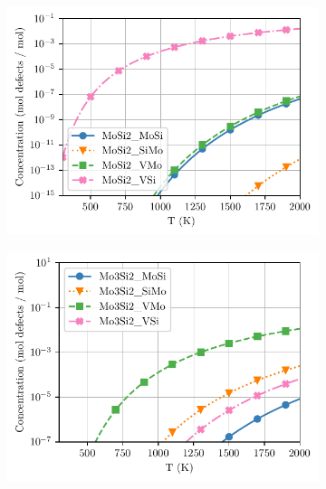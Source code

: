\documentclass[7.5pt]{article}
\theoremstyle{plain}
\theoremstyle{definition}
\newcommand{\<}{\langle}
\renewcommand{\>}{\rangle}
\begin{document}
\begin{multicols}{2}

\end{multicols}

\begin{figure}
\centering
\begin{subfigure}{.5\textwidth}
  \centering
  \includegraphics[width=\linewidth]{mosi2defects-zoomed-in}
  \caption{}
  \label{fig:sub1}
\end{subfigure}%
\begin{subfigure}{.5\textwidth}
  \centering
  \includegraphics[width=\linewidth]{mo3si2defects-zoomed-in}

\end{subfigure}
\end{figure}
\end{document}
